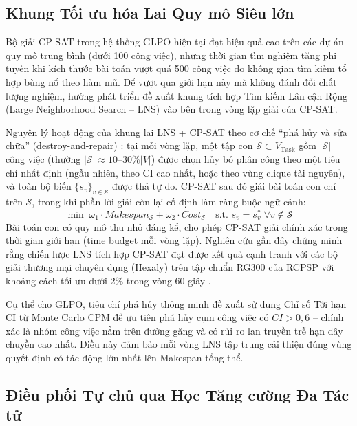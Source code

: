 \subsection{Khung Tối ưu hóa Lai Quy mô Siêu lớn}
\label{sec:4.3.2_hybrid_lns}

Bộ giải CP-SAT trong hệ thống GLPO hiện tại đạt hiệu quả cao trên các dự án quy mô trung bình (dưới 100 công việc), nhưng thời gian tìm nghiệm tăng phi tuyến khi kích thước bài toán vượt quá 500 công việc do không gian tìm kiếm tổ hợp bùng nổ theo hàm mũ. Để vượt qua giới hạn này mà không đánh đổi chất lượng nghiệm, hướng phát triển đề xuất khung tích hợp Tìm kiếm Lân cận Rộng (Large Neighborhood Search -- LNS) vào bên trong vòng lặp giải của CP-SAT.

Nguyên lý hoạt động của khung lai LNS + CP-SAT theo cơ chế ``phá hủy và sửa chữa'' (destroy-and-repair) \cite{pisinger2019lns}: tại mỗi vòng lặp, một tập con $\mathcal{S} \subset V_{\text{Task}}$ gồm $|\mathcal{S}|$ công việc (thường $|\mathcal{S}| \approx 10\text{--}30\%|V|$) được chọn hủy bỏ phân công theo một tiêu chí nhất định (ngẫu nhiên, theo CI cao nhất, hoặc theo vùng clique tài nguyên), và toàn bộ biến $\{s_v\}_{v \in \mathcal{S}}$ được thả tự do. CP-SAT sau đó giải bài toán con chỉ trên $\mathcal{S}$, trong khi phần lời giải còn lại cố định làm ràng buộc ngữ cảnh:
\begin{equation}
    \min \; \omega_1 \cdot Makespan_\mathcal{S} + \omega_2 \cdot Cost_\mathcal{S} \quad \text{s.t. } s_v = s_v^* \; \forall v \notin \mathcal{S}
\end{equation}
Bài toán con có quy mô thu nhỏ đáng kể, cho phép CP-SAT giải chính xác trong thời gian giới hạn (time budget mỗi vòng lặp). Nghiên cứu gần đây chứng minh rằng chiến lược LNS tích hợp CP-SAT đạt được kết quả cạnh tranh với các bộ giải thương mại chuyên dụng (Hexaly) trên tập chuẩn RG300 của RCPSP với khoảng cách tối ưu dưới 2\% trong vòng 60 giây \cite{laborie2018schedulingseminar}.

Cụ thể cho GLPO, tiêu chí phá hủy thông minh đề xuất sử dụng Chỉ số Tới hạn CI từ Monte Carlo CPM để ưu tiên phá hủy cụm công việc có $CI > 0{,}6$ -- chính xác là nhóm công việc nằm trên đường găng và có rủi ro lan truyền trễ hạn dây chuyền cao nhất. Điều này đảm bảo mỗi vòng LNS tập trung cải thiện đúng vùng quyết định có tác động lớn nhất lên Makespan tổng thể.

\subsection{Điều phối Tự chủ qua Học Tăng cường Đa Tác tử}
\label{sec:4.3.3_marl_scheduling}

